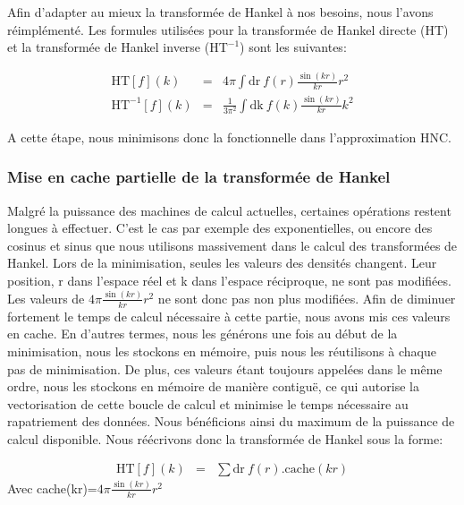 Afin d'adapter au mieux la transformée de Hankel à nos besoins, nous l'avons réimplémenté. Les formules utilisées pour la transformée de Hankel directe (HT) et la transformée de Hankel inverse ($\mathrm{HT}^{-1}$) sont les suivantes:


\begin{eqnarray}
\mathrm{HT}[f](k) &=& 4\pi\int \mathrm{dr}\ f(r)\frac{\sin(kr)}{kr}r^2\\
\mathrm{HT}^{-1}[f](k) &=& \frac{1}{3\pi^2}\int \mathrm{dk}\ f(k)\frac{\sin(kr)}{kr}k^2
\end{eqnarray}

A cette étape, nous minimisons donc la fonctionnelle dans l'approximation HNC.  


\subsubsection{Mise en cache partielle de la transformée de Hankel}
Malgré la puissance des machines de calcul actuelles, certaines opérations restent longues à effectuer. C'est le cas par exemple des exponentielles, ou encore des cosinus et sinus que nous utilisons massivement dans le calcul des transformées de Hankel.
Lors de la minimisation, seules les valeurs des densités changent. Leur position, r dans l'espace réel et k dans l'espace réciproque, ne sont pas modifiées. Les valeurs de $4\pi\frac{\sin(kr)}{kr}r^2$ ne sont donc pas non plus modifiées. Afin de diminuer fortement le temps de calcul nécessaire à cette partie, nous avons mis ces valeurs en cache. En d'autres termes, nous les générons une fois au début de la minimisation, nous les stockons en mémoire, puis nous les réutilisons à chaque pas de minimisation. De plus, ces valeurs étant toujours appelées dans le même ordre, nous les stockons en mémoire de manière contiguë, ce qui autorise la vectorisation de cette boucle de calcul et minimise le temps nécessaire au rapatriement des données. Nous bénéficions ainsi du maximum de la puissance de calcul disponible. Nous réécrivons donc la transformée de Hankel sous la forme:

\begin{eqnarray}
\mathrm{HT}[f](k) &=& \sum \mathrm{dr}\ f(r) . \mathrm{cache}(kr)
\end{eqnarray}
Avec cache(kr)=$4\pi\frac{\sin(kr)}{kr}r^2$


